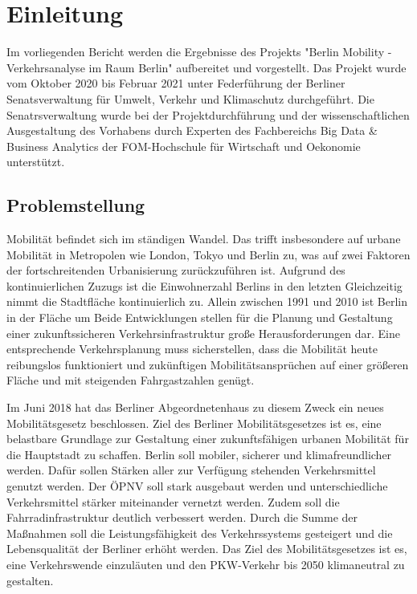 \section{Einleitung}
Im vorliegenden Bericht werden die Ergebnisse des Projekts "Berlin Mobility - Verkehrsanalyse im Raum Berlin" aufbereitet und vorgestellt. Das Projekt wurde vom Oktober 2020 bis Februar 2021 unter Federführung der Berliner Senatsverwaltung für Umwelt, Verkehr und Klimaschutz durchgeführt. Die Senatrsverwaltung wurde bei der Projektdurchführung und der wissenschaftlichen Ausgestaltung des Vorhabens durch Experten des Fachbereichs Big Data \& Business Analytics der FOM-Hochschule für Wirtschaft und Oekonomie unterstützt. 

\subsection{Problemstellung}
Mobilität befindet sich im ständigen Wandel. Das trifft insbesondere auf urbane Mobilität in Metropolen wie London, Tokyo und Berlin zu, was auf zwei Faktoren der fortschreitenden Urbanisierung zurückzuführen ist. Aufgrund des kontinuierlichen Zuzugs ist die Einwohnerzahl Berlins in den letzten  Gleichzeitig nimmt die Stadtfläche kontinuierlich zu. Allein zwischen 1991 und 2010 ist Berlin in der Fläche um   Beide Entwicklungen stellen für die Planung und Gestaltung einer zukunftssicheren Verkehrsinfrastruktur große Herausforderungen dar. Eine entsprechende Verkehrsplanung muss sicherstellen, dass die Mobilität heute reibungslos funktioniert und zukünftigen Mobilitätsansprüchen auf einer größeren Fläche und mit steigenden Fahrgastzahlen genügt. 

Im Juni 2018 hat das Berliner Abgeordnetenhaus zu diesem Zweck ein neues Mobilitätsgesetz beschlossen. Ziel des Berliner Mobilitätsgesetzes ist es, eine belastbare Grundlage zur Gestaltung einer zukunftsfähigen urbanen Mobilität für die Hauptstadt zu schaffen. Berlin soll mobiler, sicherer und klimafreundlicher werden. Dafür sollen Stärken aller zur Verfügung stehenden Verkehrsmittel genutzt werden. Der ÖPNV soll stark ausgebaut werden und unterschiedliche Verkehrsmittel stärker miteinander vernetzt werden. Zudem soll die Fahrradinfrastruktur deutlich verbessert werden. Durch die Summe der Maßnahmen soll die Leistungsfähigkeit des Verkehrssystems gesteigert und die Lebensqualität der Berliner erhöht werden. Das Ziel des Mobilitätsgesetzes ist es, eine Verkehrswende einzuläuten und den PKW-Verkehr bis 2050 klimaneutral zu gestalten. 

